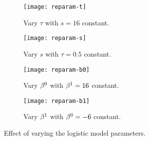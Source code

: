 \begin{figure}
  \centering
  \begin{subfigure}{\plotwidth}
    \texttt{[image: reparam-t]}
    \caption{Vary $\tau$ with $s = 16$ constant.}%
    \label{fig:reparam-t}
  \end{subfigure}
  \begin{subfigure}{\plotwidth}
    \texttt{[image: reparam-s]}
    \caption{Vary $s$ with $\tau = 0.5$ constant.}%
    \label{fig:reparam-s}
  \end{subfigure}
  \begin{subfigure}{\plotwidth}
    \texttt{[image: reparam-b0]}
    \caption{Vary $\beta^0$ with $\beta^1 = 16$ constant.}%
    \label{fig:reparam-b0}
  \end{subfigure}
  \begin{subfigure}{\plotwidth}
    \texttt{[image: reparam-b1]}
    \caption{Vary $\beta^1$ with $\beta^0 = -6$ constant.}%
    \label{fig:reparam-b1}
  \end{subfigure}
  \caption{Effect of varying the logistic model parameters.}%
  \label{fig:reparam}
\end{figure}
